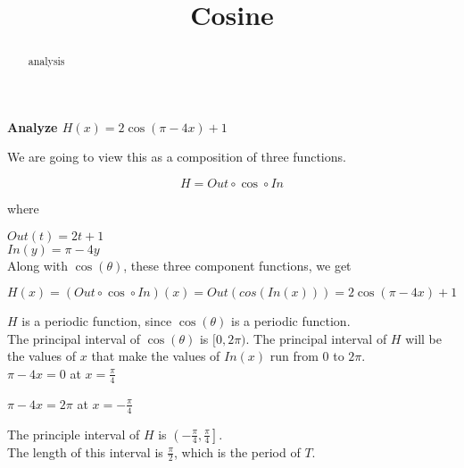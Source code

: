 \documentclass{ximera}
\title{Cosine}
\begin{document}
\begin{abstract}
analysis
\end{abstract}
\maketitle












\textbf{\textcolor{purple!85!blue}{Analyze  $H(x) =  2 \cos(\pi - 4x) + 1$}}





\begin{template}


We are going to view this as a composition of three functions.


\[
H = Out \circ \cos \circ In
\]


where


$Out(t) = 2t + 1$ \\


$In(y) = \pi - 4y$ \\




Along with $\cos(\theta)$, these three component functions, we get



\[
H(x) = (Out \circ \cos \circ In)(x) = Out(cos(In(x)))  = 2 \cos(\pi - 4x) + 1
\]




\end{template}

$H$ is a periodic function, since $\cos(\theta)$ is a periodic function. \\

The principal interval of $\cos(\theta)$ is $[0, 2\pi)$.  The principal interval of $H$ will be the values of $x$ that make the values of $In(x)$ run from $0$ to $2\pi$. \\


$\pi - 4x = 0$ at $x = \frac{\pi}{4}$

$\pi - 4x = 2\pi$ at $x = -\frac{\pi}{4}$

The principle interval of $H$ is $\left( -\frac{\pi}{4}, \frac{\pi}{4} \right]$. \\

The length of this interval is $\frac{\pi}{2}$, which is the period of $T$. \\
\end{document}
